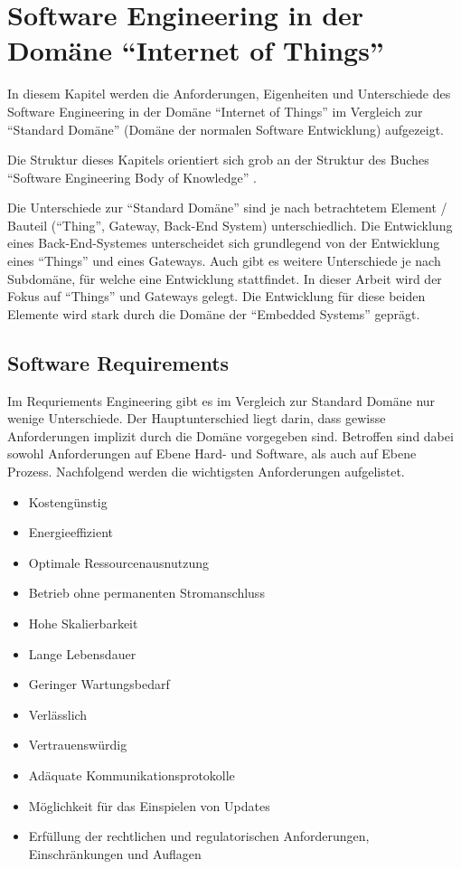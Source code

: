 \chapter{Software Engineering in der Domäne "`Internet of Things"'} \label{chap:sweInIot}
In diesem Kapitel werden die Anforderungen, Eigenheiten und Unterschiede des Software Engineering in der Domäne "`Internet of Things"' im Vergleich zur "`Standard Domäne"' (Domäne der normalen Software Entwicklung) aufgezeigt.

Die Struktur dieses Kapitels orientiert sich grob an der Struktur des Buches "`Software Engineering Body of Knowledge"' \cite{B:IEEE:SWEBOOK}.

Die Unterschiede zur "`Standard Domäne"' sind je nach betrachtetem Element / Bauteil ("`Thing"', Gateway, Back-End System) unterschiedlich. Die Entwicklung eines Back-End-Systemes unterscheidet sich grundlegend von der Entwicklung eines "`Things"' und eines Gateways. Auch gibt es weitere Unterschiede je nach Subdomäne, für welche eine Entwicklung stattfindet. In dieser Arbeit wird der Fokus auf "`Things"' und Gateways gelegt. Die Entwicklung für diese beiden Elemente wird stark durch die Domäne der "`Embedded Systems"' geprägt.


\section{Software Requirements}
Im Requriements Engineering gibt es im Vergleich zur Standard Domäne nur wenige Unterschiede. Der Hauptunterschied liegt darin, dass gewisse Anforderungen implizit durch die Domäne vorgegeben sind. Betroffen sind dabei sowohl Anforderungen auf Ebene Hard- und Software, als auch auf Ebene Prozess. Nachfolgend werden die wichtigsten Anforderungen aufgelistet.

\begin{itemize}
\item Kostengünstig
\item Energieeffizient
\item Optimale Ressourcenausnutzung
\item Betrieb ohne permanenten Stromanschluss
\item Hohe Skalierbarkeit
\item Lange Lebensdauer
\item Geringer Wartungsbedarf
\item Verlässlich
\item Vertrauenswürdig
\item Adäquate Kommunikationsprotokolle
\item Möglichkeit für das Einspielen von Updates
\item Erfüllung der rechtlichen und regulatorischen Anforderungen, Einschränkungen und Auflagen
\end{itemize}

